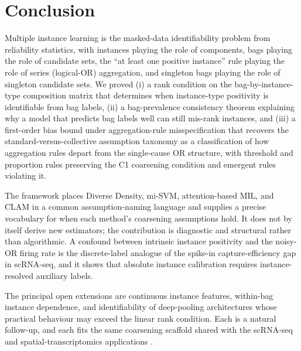 \section{Conclusion}
\label{sec:conclusion}

Multiple instance learning is the masked-data identifiability
problem from reliability statistics, with instances playing the
role of components, bags playing the role of candidate sets, the
``at least one positive instance'' rule playing the role of series
(logical-OR) aggregation, and singleton bags playing the role of
singleton candidate sets. We proved (i) a rank condition on the
bag-by-instance-type composition matrix that determines when
instance-type positivity is identifiable from bag labels, (ii) a
bag-prevalence consistency theorem explaining why a model that
predicts bag labels well can still mis-rank instances, and (iii) a
first-order bias bound under aggregation-rule misspecification that
recovers the standard-versus-collective assumption taxonomy as a
classification of how aggregation rules depart from the single-cause
OR structure, with threshold and proportion rules preserving the C1
coarsening condition and emergent rules violating it.

The framework places Diverse Density, mi-SVM, attention-based MIL,
and CLAM in a common assumption-naming language and supplies a
precise vocabulary for when each method's coarsening assumptions
hold. It does not by itself derive new estimators; the contribution
is diagnostic and structural rather than algorithmic. A confound between
intrinsic instance positivity and the noisy-OR firing rate is the
discrete-label analogue of the spike-in capture-efficiency gap in
scRNA-seq, and it shows that absolute instance calibration requires
instance-resolved auxiliary labels.

The principal open extensions are continuous instance features,
within-bag instance dependence, and identifiability of deep-pooling
architectures whose practical behaviour may exceed the linear rank
condition. Each is a natural follow-up, and each fits the same
coarsening scaffold shared with the scRNA-seq and
spatial-transcriptomics applications \citep{towell2026scrnacoarsening,
towell2026spatialcoarsening}.
